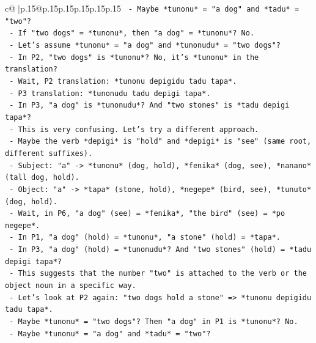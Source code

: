 \documentclass{article}
\begin{document}
{\begin{supertabular}{c@{$\;$}|p{.15\linewidth}@{}p{.15\linewidth}p{.15\linewidth}p{.15\linewidth}p{.15\linewidth}p{.15\linewidth}}
{{{\texttt{                            {-} Maybe *tunonu* = "a dog" and *tadu* = "two"?} \\
\texttt{                            {-} If "two dogs" = *tunonu*, then "a dog" = *tunonu*? No.} \\
\texttt{                            {-} Let's assume *tunonu* = "a dog" and *tunonudu* = "two dogs"?} \\
\texttt{                            {-} In P2, "two dogs" is *tunonu*? No, it's *tunonu* in the translation?} \\
\texttt{                            {-} Wait, P2 translation: *tunonu depigidu tadu tapa*.} \\
\texttt{                            {-} P3 translation: *tunonudu tadu depigi tapa*.} \\
\texttt{                            {-} In P3, "a dog" is *tunonudu*? And "two stones" is *tadu depigi tapa*?} \\
\texttt{                            {-} This is very confusing. Let's try a different approach.} \\
\texttt{                            {-} Maybe the verb *depigi* is "hold" and *depigi* is "see" (same root, different suffixes).} \\
\texttt{                            {-} Subject: "a" {-}> *tunonu* (dog, hold), *fenika* (dog, see), *nanano* (tall dog, hold).} \\
\texttt{                            {-} Object: "a" {-}> *tapa* (stone, hold), *negepe* (bird, see), *tunuto* (dog, hold).} \\
\texttt{                            {-} Wait, in P6, "a dog" (see) = *fenika*, "the bird" (see) = *po negepe*.} \\
\texttt{                            {-} In P1, "a dog" (hold) = *tunonu*, "a stone" (hold) = *tapa*.} \\
\texttt{                            {-} In P3, "a dog" (hold) = *tunonudu*? And "two stones" (hold) = *tadu depigi tapa*?} \\
\texttt{                            {-} This suggests that the number "two" is attached to the verb or the object noun in a specific way.} \\
\texttt{                            {-} Let's look at P2 again: "two dogs hold a stone" => *tunonu depigidu tadu tapa*.} \\
\texttt{                              {-} Maybe *tunonu* = "two dogs"? Then "a dog" in P1 is *tunonu*? No.} \\
\texttt{                              {-} Maybe *tunonu* = "a dog" and *tadu* = "two"?} \\
}}}
\end{supertabular}}
\end{document}
